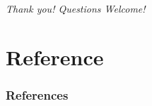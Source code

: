 \documentclass[10pt]{beamer}
\begin{document}
\begin{frame}{}
	\centering \Large
	\emph{Thank you! Questions Welcome!}
\end{frame}

\section*{Reference}

\begin{frame}[allowframebreaks]
	\frametitle{References}
	
	\footnotesize
	
\end{frame}
	
\end{document}
